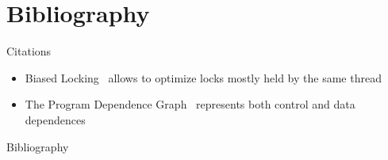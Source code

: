 

\part{Bibliography}

\begin{frame}
\partpage
\end{frame}

\begin{frame}{Citations}
\begin{itemize}
  \item Biased Locking~\cite{DBLP:conf/oopsla/RussellD06} allows to optimize
        locks mostly held by the same thread

  \item The Program Dependence Graph~\cite{DBLP:journals/toplas/FerranteOW87}
        represents both control and data dependences
\end{itemize}
\end{frame}

\begin{frame}{Bibliography}


\end{frame}
